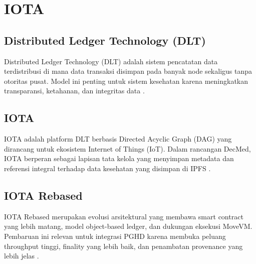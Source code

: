 \section{IOTA}

\subsection{Distributed Ledger Technology (DLT)}
Distributed Ledger Technology (DLT) adalah sistem pencatatan data terdistribusi di mana data transaksi disimpan pada banyak node sekaligus tanpa otoritas pusat. Model ini penting untuk sistem kesehatan karena meningkatkan transparansi, ketahanan, dan integritas data \parencite{Qin_2016_PRE}.

\subsection{IOTA}
IOTA adalah platform DLT berbasis Directed Acyclic Graph (DAG) yang dirancang untuk ekosistem Internet of Things (IoT). Dalam rancangan DecMed, IOTA berperan sebagai lapisan tata kelola yang menyimpan metadata dan referensi integral terhadap data kesehatan yang disimpan di IPFS \parencite{Hari_2025,AfyaRepo_2024_IOTA_Tangle}.

\subsection{IOTA Rebased}
IOTA Rebased merupakan evolusi arsitektural yang membawa smart contract yang lebih matang, model object-based ledger, dan dukungan eksekusi MoveVM. Pembaruan ini relevan untuk integrasi PGHD karena membuka peluang throughput tinggi, finality yang lebih baik, dan penambatan provenance yang lebih jelas \parencite{IOTA_Rebased_2025,FourPillars_2025_IOTA_Rebased,IOTA_Manifesto_2025}.






